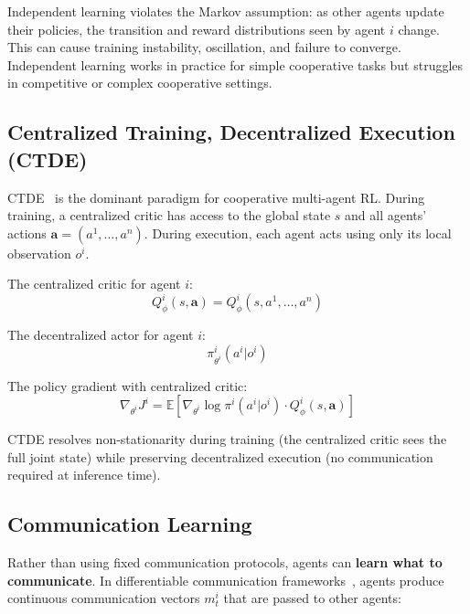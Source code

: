 \begin{warningbox}
Independent learning violates the Markov assumption: as other agents update their policies, the transition and reward distributions seen by agent $i$ change. This can cause training instability, oscillation, and failure to converge. Independent learning works in practice for simple cooperative tasks but struggles in competitive or complex cooperative settings.
\end{warningbox}

\subsection{Centralized Training, Decentralized Execution (CTDE)}
\label{centralized-training-decentralized-execution-ctde}

CTDE~\cite{lowe2017multi, rashid2018qmix} is the dominant paradigm for cooperative multi-agent RL. During training, a centralized critic has access to the global state $s$ and all agents’ actions $\mathbf{a} = (a^1, \ldots, a^n)$. During execution, each agent acts using only its local observation $o^i$.

The centralized critic for agent $i$: 
\begin{equation}
  Q^i_\phi(s, \mathbf{a}) = Q^i_\phi(s, a^1, \ldots, a^n)
\end{equation}

The decentralized actor for agent $i$: 
\begin{equation}
  \pi^i_{\theta^i}(a^i | o^i)
\end{equation}

The policy gradient with centralized critic: 
\begin{equation}
  \nabla_{\theta^i} J^i = \mathbb{E}\left[\nabla_{\theta^i} \log \pi^i(a^i | o^i) \cdot Q^i_\phi(s, \mathbf{a})\right]
\end{equation}

CTDE resolves non-stationarity during training (the centralized critic sees the full joint state) while preserving decentralized execution (no communication required at inference time).

\subsection{Communication Learning}
\label{communication-learning}

Rather than using fixed communication protocols, agents can \textbf{learn what to communicate}. In differentiable communication frameworks~\cite{sukhbaatar2016learning, das2019tarmac}, agents produce continuous communication vectors $m^i_t$ that are passed to other agents:

